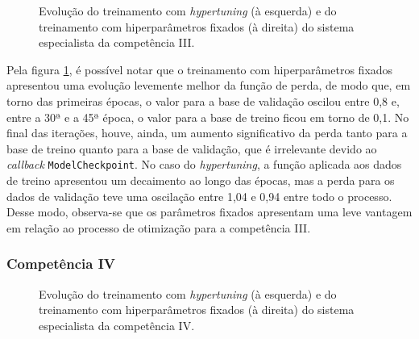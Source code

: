 \begin{figure}[H]
    \begin{minipage}{0.45\textwidth}
        \resizebox{\textwidth}{!}{}
    \end{minipage}
    \begin{minipage}{0.45\textwidth}
        \resizebox{\textwidth}{!}{}
    \end{minipage}

    \caption{Evolução do treinamento com \textit{hypertuning} (à esquerda) e do treinamento com hiperparâmetros fixados (à direita) do sistema especialista da competência III.}
    \label{fig:exp-fix-c3}
\end{figure}

Pela figura \ref{fig:exp-fix-c3}, é possível notar que o treinamento com hiperparâmetros fixados apresentou uma evolução levemente melhor da função de perda, de modo que, em torno das primeiras épocas, o valor para a base de validação oscilou entre 0,8 e, entre a 30ª e a 45ª época, o valor para a base de treino ficou em torno de 0,1. No final das iterações, houve, ainda, um aumento significativo da perda tanto para a base de treino quanto para a base de validação, que é irrelevante devido ao \textit{callback} \texttt{ModelCheckpoint}. No caso do \textit{hypertuning}, a função aplicada aos dados de treino apresentou um decaimento ao longo das épocas, mas a perda para os dados de validação teve uma oscilação entre 1,04 e 0,94 entre todo o processo. Desse modo, observa-se que os parâmetros fixados apresentam uma leve vantagem em relação ao processo de otimização para a competência III.

\subsubsection{Competência IV}
\label{subsec:exp-fix-c4}

\begin{figure}[H]
    \begin{minipage}{0.45\textwidth}
        \resizebox{\textwidth}{!}{}
    \end{minipage}
    \begin{minipage}{0.45\textwidth}
        \resizebox{\textwidth}{!}{}
    \end{minipage}

    \caption{Evolução do treinamento com \textit{hypertuning} (à esquerda) e do treinamento com hiperparâmetros fixados (à direita) do sistema especialista da competência IV.}
    \label{fig:exp-fix-c4}
\end{figure}

